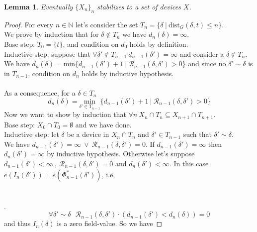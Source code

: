 \documentclass{article}
\theoremstyle{plain}
\newtheorem{lem}[teo]{Lemma}
\theoremstyle{remark}
\begin{document}
\begin{lem}
 Eventually $\{X_n\}_n$ stabilizes to a set of devices $X$.
\end{lem}
\begin{proof}
For every $n\in\mathbb{N}$ let's consider the set $T_n=\{\delta\ |\ \mathrm{dist}_G(\delta, t)\leq n\}$.\\
We prove by induction that for $\delta\not\in T_n $ we have $d_n(\delta)=\infty$.\\
Base step: $T_0=\{t\}$, and condition on $d_0$ holds by definition.\\
Inductive step: suppose that $\forall \delta'\not\in T_{n-1}\ d_{n-1}(\delta')=\infty$ and consider a  $\delta \not\in T_n$. We have  $d_n(\delta)= \mathrm{min}\big\{d_{n-1}(\delta') + 1\ |\  \mathcal{R}_{n-1}(\delta, \delta')>0\big\}$ and since no $\delta'\sim \delta$ is in $T_{n-1}$, condition on $d_n$ holds by inductive hypothesis.\\ \\
As a consequence, for a $\delta\in  T_n$ 
\begin{equation*}
d_n(\delta) =  \underset{\delta'\in T_{n-1}}{\mathrm{min}}\big\{d_{n-1}(\delta') + 1\ |\  \mathcal{R}_{n-1}(\delta, \delta')>0\big\}
\end{equation*}
 Now we want to show by induction that $\displaystyle{\forall n\  X_n\cap T_n \subseteq X_{n+1} \cap T_{n+1}}$.\\ 
Base step: $X_0\cap T_0 = \emptyset$ and we have done.\\
 Inductive step: let  $\delta$ be a device in $X_n\cap T_n$ and $\delta'\in T_{n-1}$ such that $\delta'\sim\delta$. \\
We have $\displaystyle{d_{n-1}(\delta')=\infty\ \lor\ \mathcal{R}_{n-1}(\delta, \delta') = 0}$. If $d_{n-1}(\delta')=\infty$ then $d_n(\delta')=\infty$ by inductive hypothesis. Otherwise let's suppose $d_{n-1}(\delta')<\infty\ ,\ \mathcal{R}_{n-1}(\delta, \delta') = 0$ and $d_n(\delta')<\infty$. In this case $e(I_{n}(\delta'))=e(\Phi^*_{n-1}(\delta'  ))$, i.e. 
\\ \\ \\.
\begin{equation*}
\forall\delta'\sim\delta\ \ \ \mathcal{R}_{n-1}(\delta, \delta')\cdot(d_{n-1}(\delta')<d_{n}(\delta)) = 0
\end{equation*}
and thus $I_n(\delta)$ is a zero field-value.
So we have 

\end{proof}
\end{document}
